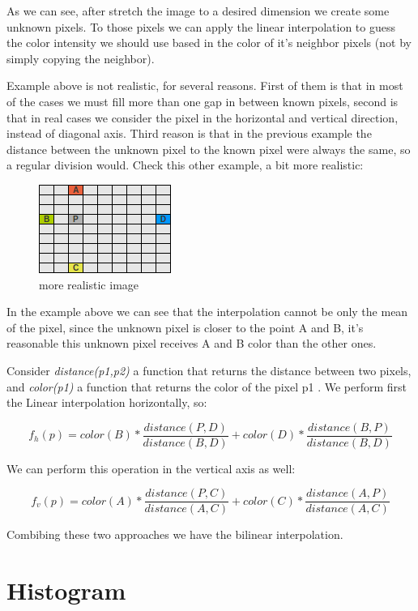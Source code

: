 \documentclass{article}
\begin{document}
	As we can see, after stretch the image to a desired dimension we create some unknown pixels. To those pixels we can apply the linear interpolation 
	to guess the color intensity we should use based in the color of it's neighbor pixels (not by simply copying the neighbor).

	Example above is not realistic, for several reasons. First of them is that in most of the cases we must fill more than one gap in between known pixels,
	second is that in real cases we consider the pixel in the horizontal and vertical direction, instead of diagonal axis. Third reason is that in the 
	previous example the distance between the unknown pixel to the known pixel were always the same, so a regular division would. 
	Check this other example, a bit more realistic:
	
	\begin{figure} [H]
		\centering
		\includegraphics[scale=1]{images/bilinear_interpolation_3}
		\caption{more realistic image\label{bilinear3}}
	\end{figure}
	
	In the example above we can see that the interpolation cannot be only the mean of the pixel, since the unknown pixel 
	is closer to the point A and B, it's reasonable 
	this unknown pixel receives A and B color than the other ones.

	Consider \textit{distance(p1,p2)} a function that returns the distance between two pixels, 
	and \textit{color(p1)} a function that returns the color of the pixel p1 . We perform first the Linear interpolation horizontally, so:

	\[ f_h(p)=color(B)*\frac{distance(P,D)}{distance(B,D)}+color(D)*\frac{distance(B,P)}{distance(B,D)}  \]

	We can perform this operation in the vertical axis as well:

	\[ f_v(p)=color(A)*\frac{distance(P,C)}{distance(A,C)}+color(C)*\frac{distance(A,P)}{distance(A,C)}  \]

	Combibing these two approaches we have the bilinear interpolation.

	
\section{Histogram}
\end{document}
